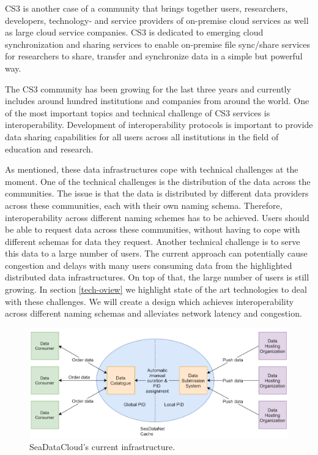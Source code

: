 CS3 is another case of a community that brings together users, researchers, developers, 
technology- and service providers of on-premise cloud services as well as large cloud service companies.
CS3 is dedicated to emerging cloud synchronization and sharing services 
to enable on-premise file sync/share services for researchers to share, transfer
and synchronize data in a simple but powerful way.

The CS3 community has been growing for the last three years and currently includes
around hundred institutions and companies from around the world.
One of the most important topics and technical challenge of CS3 services is interoperability. 
Development of interoperability protocols is important to provide data 
sharing capabilities for all users across all institutions in the field of education and research.

As mentioned, these data infrastructures cope with technical challenges at the moment. One of the technical challenges is the distribution of the data across the communities. The issue is that the data is distributed by different data providers across these communities, each with their own
naming schema. Therefore, interoperability across different naming schemes has to be achieved. Users should be able to request data across these communities, without having to cope with different schemas for data they request. Another technical challenge is to serve this data 
to a large number of users. The current approach can potentially cause congestion and delays with
many users consuming data from the highlighted distributed data infrastructures. On top of that, the large number of users is still growing. In section \ref{tech-oview} we highlight state of the art technologies to deal with these challenges. We will create a design which achieves interoperability across different naming schemas and alleviates network latency and congestion.

\begin{figure}[H]
\centering
\includegraphics[scale=0.6]{Images/SDC_current.png}
\caption{SeaDataCloud's current infrastructure.}
\label{fig:sdc_cur}
\end{figure}

